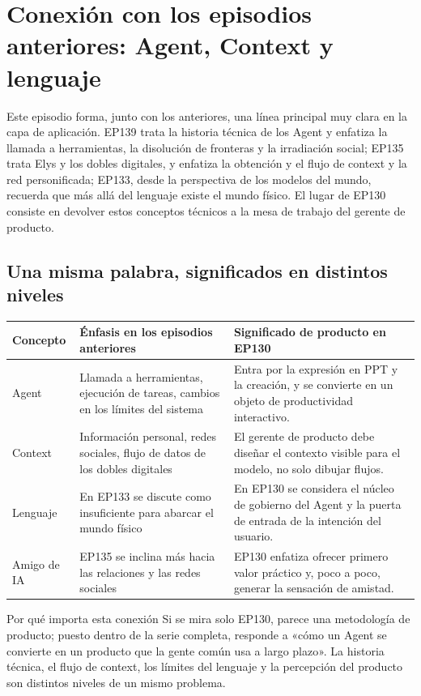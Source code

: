 \section{Conexión con los episodios anteriores: Agent, Context y lenguaje}

Este episodio forma, junto con los anteriores, una línea principal muy clara en la capa de aplicación. EP139 trata la historia técnica de los Agent y enfatiza la llamada a herramientas, la disolución de fronteras y la irradiación social; EP135 trata Elys y los dobles digitales, y enfatiza la obtención y el flujo de context y la red personificada; EP133, desde la perspectiva de los modelos del mundo, recuerda que más allá del lenguaje existe el mundo físico. El lugar de EP130 consiste en devolver estos conceptos técnicos a la mesa de trabajo del gerente de producto.

\subsection{Una misma palabra, significados en distintos niveles}

\begin{longtable}{p{}p{}p{}}
\toprule
Concepto & Énfasis en los episodios anteriores & Significado de producto en EP130 \\
\midrule
Agent & Llamada a herramientas, ejecución de tareas, cambios en los límites del sistema & Entra por la expresión en PPT y la creación, y se convierte en un objeto de productividad interactivo. \\
Context & Información personal, redes sociales, flujo de datos de los dobles digitales & El gerente de producto debe diseñar el contexto visible para el modelo, no solo dibujar flujos. \\
Lenguaje & En EP133 se discute como insuficiente para abarcar el mundo físico & En EP130 se considera el núcleo de gobierno del Agent y la puerta de entrada de la intención del usuario. \\
Amigo de IA & EP135 se inclina más hacia las relaciones y las redes sociales & EP130 enfatiza ofrecer primero valor práctico y, poco a poco, generar la sensación de amistad. \\
\bottomrule
\end{longtable}

\begin{knowledgebox}{Por qué importa esta conexión}
Si se mira solo EP130, parece una metodología de producto; puesto dentro de la serie completa, responde a «cómo un Agent se convierte en un producto que la gente común usa a largo plazo». La historia técnica, el flujo de context, los límites del lenguaje y la percepción del producto son distintos niveles de un mismo problema.
\end{knowledgebox}

